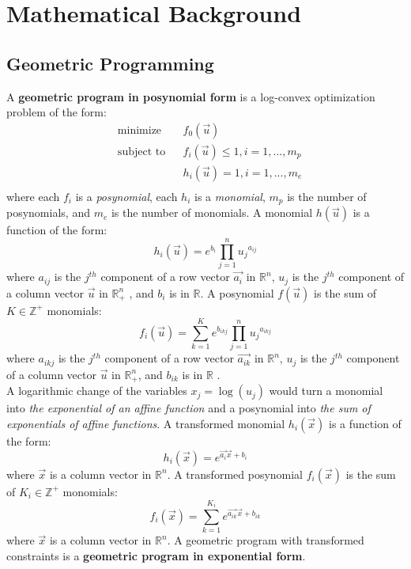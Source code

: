 \section{Mathematical Background}
\subsection{Geometric Programming}
A \textbf{geometric program in posynomial form} is a log-convex optimization problem of the form:
\begin{equation}
\begin{aligned}
	& \text{minimize} && f_0 \left(\vec{u}\right) \\
	& \text{subject to} && f_i \left(\vec{u}\right) \leq 1, i = 1,...,m_p\\
	& && h_i \left(\vec{u}\right) = 1, i = 1, ...,m_e\\
\end{aligned}
\label{GP_standard}
\end{equation}
where each $f_i$ is a {\em posynomial}, each $h_i$ is a {\em monomial}, $m_p$ is the number of posynomials, and $m_e$ is the number of monomials. A monomial $h(\vec{u})$ is a function of the form:
\begin{displaymath}
	h_i(\vec{u}) = e^{b_i}\textstyle{\prod}_{j=1}^{n}{u_j}^{a_{ij}}
\end{displaymath}
where $a_{ij}$ is the $j^{th}$ component of a row vector $\vec{a_i}$ in $\mathbb{R}^n$, $u_j$ is the $j^{th}$ component of a column vector $\vec{u}$ in $\mathbb{R}^n_+$ , and $b_i$ is in $\mathbb{R}$. A posynomial $f(\vec{u})$ is the sum of $K \in \mathbb{Z}^+$ monomials:
\begin{displaymath}
	f_i(\vec{u}) = \textstyle{\sum_{k=1}^{K}}e^{b_{ikj}}\prod_{j=1}^{n}{u_j}^{a_{ikj}}
\end{displaymath}
where $a_{ikj}$ is the $j^{th}$ component of a row vector $\vec{a_{ik}}$ in $\mathbb{R}^n$, $u_j$ is the $j^{th}$ component of a column vector $\vec{u}$ in $\mathbb{R}^n_+$, and $b_{ik}$ is in $\mathbb{R}$ \cite{Boyd2007}.\\
A logarithmic change of the variables $x_j = \log(u_j)$ would turn a monomial into {\em  the exponential of an affine function} and a posynomial into {\em the sum of exponentials of affine functions}. A transformed monomial $h_i(\vec{x})$ is a function of the form:
\begin{displaymath}
    h_i(\vec{x}) = e^{\vec{a_i}\vec{x} + b_i}
\end{displaymath}
where $\vec{x}$ is a column vector in $\mathbb{R}^n$. A transformed posynomial $f_i(\vec{x})$ is the sum of $K_i \in \mathbb{Z}^+$ monomials:
\begin{displaymath}
    f_i(\vec{x}) = \textstyle{\sum_{k=1}^{K_i}}e^{\vec{a_{ik}}\vec{x} + b_{ik}}
\end{displaymath}
where $\vec{x}$ is a column vector in $\mathbb{R}^n$. A geometric program with transformed constraints is a \textbf{geometric program in exponential form}.

